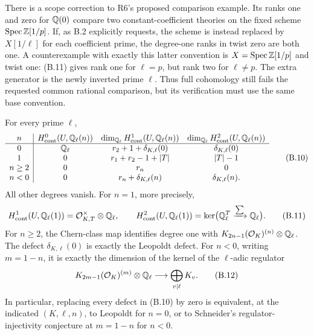 There is a scope correction to R6's proposed comparison example.
Its ranks one and zero for \(\mathbb Q(0)\) compare two constant-coefficient
theories on the fixed scheme \(\operatorname{Spec}\mathbb Z[1/p]\).  If, as B.2
explicitly requests, the scheme is instead replaced by
\(X[1/\ell]\) for each coefficient prime, the degree-one ranks in
twist zero are both one.  A counterexample with exactly this latter
convention is \(X=\operatorname{Spec}\mathbb Z[1/p]\) and twist one: (B.11) gives
rank one for \(\ell=p\), but rank two for \(\ell\ne p\).
The extra generator is the newly inverted prime \(\ell\).
Thus full cohomology still fails the requested common rational
comparison, but its verification must use the same base convention.

\begin{theorem}
\label{thm:B-full-tate}
For every prime \(\ell\),
\[
\begin{array}{c|ccc}
n&H^0_{\mathrm{cont}}(U,\mathbb Q_\ell(n))&
\dim_{\mathbb Q_\ell}H^1_{\mathrm{cont}}(U,\mathbb Q_\ell(n))&
\dim_{\mathbb Q_\ell}H^2_{\mathrm{cont}}(U,\mathbb Q_\ell(n))\\ \hline
0&\mathbb Q_\ell&r_2+1+\delta_{K,\ell}(0)&\delta_{K,\ell}(0)\\
1&0&r_1+r_2-1+|T|&|T|-1\\
n\ge2&0&r_n&0\\
n<0&0&r_n+\delta_{K,\ell}(n)&\delta_{K,\ell}(n).
\end{array}\tag{B.10}
\]
All other degrees vanish.  For \(n=1\), more precisely,
\[
 H^1_{\mathrm{cont}}(U,\mathbb Q_\ell(1))=
 \mathcal O_{K,T}^\times\otimes\mathbb Q_\ell,\qquad
 H^2_{\mathrm{cont}}(U,\mathbb Q_\ell(1))=
 \ker\bigl(\mathbb Q_\ell^T\xrightarrow{\sum}\mathbb Q_\ell\bigr).
 \tag{B.11}
\]
For \(n\ge2\), the Chern-class map identifies degree one with
\(K_{2n-1}(\mathcal O_K)^{(n)}\otimes\mathbb Q_\ell\).
The defect \(\delta_{K,\ell}(0)\) is exactly the Leopoldt defect.
For \(n<0\), writing \(m=1-n\), it is exactly the dimension of
the kernel of the \(\ell\)-adic regulator
\[
 K_{2m-1}(\mathcal O_K)^{(m)}\otimes\mathbb Q_\ell
 \longrightarrow\bigoplus_{v\mid\ell}K_v .\tag{B.12}
\]
In particular, replacing every defect in (B.10) by zero is equivalent,
at the indicated \((K,\ell,n)\), to Leopoldt for \(n=0\), or to
Schneider's regulator-injectivity conjecture at \(m=1-n\) for \(n<0\).
\end{theorem}
